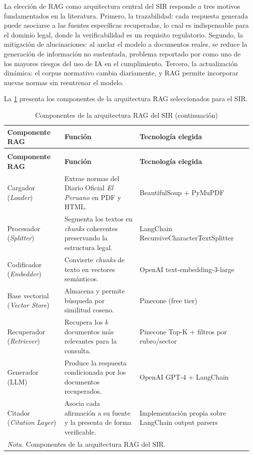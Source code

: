 \documentclass[12pt,a4paper,oneside]{report}
\begin{document}
La elección de RAG como arquitectura central del SIR responde a tres motivos fundamentados en la literatura. Primero, la trazabilidad: cada respuesta generada puede asociarse a las fuentes específicas recuperadas, lo cual es indispensable para el dominio legal, donde la verificabilidad es un requisito regulatorio. Segundo, la mitigación de alucinaciones: al anclar el modelo a documentos reales, se reduce la generación de información no sustentada, problema reportado por \textcite{siering2022} como uno de los mayores riesgos del uso de IA en el cumplimiento. Tercero, la actualización dinámica: el corpus normativo cambia diariamente, y RAG permite incorporar nuevas normas sin reentrenar el modelo.

La \cref{tab:componentes-rag-sir} presenta los componentes de la arquitectura RAG seleccionados para el SIR.

\begin{longtable}{@{}p{}p{}p{}@{}}
\caption{Componentes de la arquitectura RAG del SIR}\label{tab:componentes-rag-sir}\\
\toprule
\textbf{Componente RAG} & \textbf{Función} & \textbf{Tecnología elegida} \\
\midrule
\endfirsthead
\caption[]{Componentes de la arquitectura RAG del SIR (continuación)}\\
\toprule
\textbf{Componente RAG} & \textbf{Función} & \textbf{Tecnología elegida} \\
\midrule
\endhead
Cargador (\textit{Loader}) & Extrae normas del Diario Oficial \textit{El Peruano} en PDF y HTML. & BeautifulSoup + PyMuPDF \\
Procesador (\textit{Splitter}) & Segmenta los textos en \textit{chunks} coherentes preservando la estructura legal. & LangChain RecursiveCharacterTextSplitter \\
Codificador (\textit{Embedder}) & Convierte \textit{chunks} de texto en vectores semánticos. & OpenAI text-embedding-3-large \\
Base vectorial (\textit{Vector Store}) & Almacena y permite búsqueda por similitud coseno. & Pinecone (free tier) \\
Recuperador (\textit{Retriever}) & Recupera los \textit{k} documentos más relevantes para la consulta. & Pinecone Top-K + filtros por rubro/sector \\
Generador (LLM) & Produce la respuesta condicionada por los documentos recuperados. & OpenAI GPT-4 + LangChain \\
Citador (\textit{Citation Layer}) & Asocia cada afirmación a su fuente y la presenta de forma verificable. & Implementación propia sobre LangChain output parsers \\
\bottomrule
\multicolumn{3}{p{0.96\textwidth}}{\normalsize \textit{Nota.} Componentes de la arquitectura RAG del SIR.}\\
\end{longtable}
\end{document}
